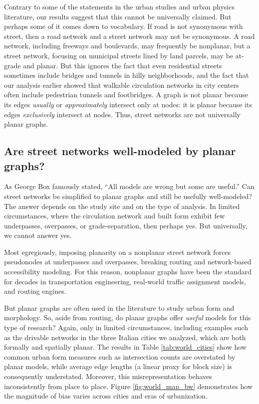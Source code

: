 \documentclass[Afour,sageh,times]{sagej}
\begin{document}
Contrary to some of the statements in the urban studies and urban physics literature, our results suggest that this cannot be universally claimed. But perhaps some of it comes down to vocabulary. If road is not synonymous with street, then a road network and a street network may not be synonymous. A road network, including freeways and boulevards, may frequently be nonplanar, but a street network, focusing on municipal streets lined by land parcels, may be at-grade and planar. But this ignores the fact that even residential streets sometimes include bridges and tunnels in hilly neighborhoods, and the fact that our analysis earlier showed that walkable circulation networks in city centers often include pedestrian tunnels and footbridges. A graph is not planar because its edges \emph{usually} or \emph{approximately} intersect only at nodes: it is planar because its edges \emph{exclusively} intersect at nodes. Thus, street networks are not universally planar graphs. 

\subsection{Are street networks well-modeled by planar graphs?}

As George Box famously stated, \enquote{All models are wrong but some are useful.} Can street networks be simplified to planar graphs and still be usefully well-modeled? The answer depends on the study site and on the type of analysis. In limited circumstances, where the circulation network and built form exhibit few underpasses, overpasses, or grade-separation, then perhaps yes. But universally, we cannot answer yes.

Most egregiously, imposing planarity on a nonplanar street network forces pseudonodes at underpasses and overpasses, breaking routing and network-based accessibility modeling. For this reason, nonplanar graphs have been the standard for decades in transportation engineering, real-world traffic assignment models, and routing engines.

But planar graphs are often used in the literature to study urban form and morphology. So, aside from routing, do planar graphs offer \emph{useful} models for this type of research? Again, only in limited circumstances, including examples such as the drivable networks in the three Italian cities we analyzed, which are both formally and spatially planar. The results in Table \ref{tab:world_cities} show how common urban form measures such as intersection counts are overstated by planar models, while average edge lengths (a linear proxy for block size) is consequently understated. Moreover, this misrepresentation behaves inconsistently from place to place. Figure \ref{fig:world_map_bw} demonstrates how the magnitude of bias varies across cities and eras of urbanization.
\end{document}
